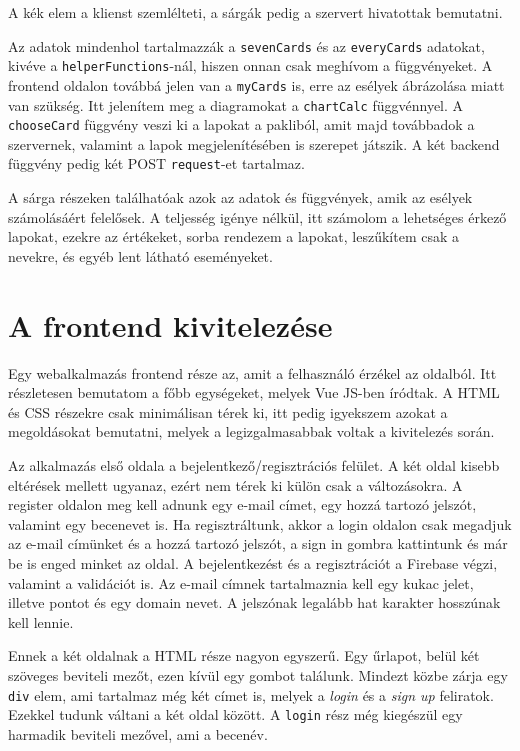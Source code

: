 \noindent A kék elem a klienst szemlélteti, a sárgák pedig a szervert hivatottak bemutatni.

Az adatok mindenhol tartalmazzák a \texttt{sevenCards} és az \texttt{everyCards} adatokat, kivéve a \texttt{helperFunctions}-nál, hiszen onnan csak meghívom a függvényeket. A frontend oldalon továbbá jelen van a \texttt{myCards} is, erre az esélyek ábrázolása miatt van szükség. Itt jelenítem meg a diagramokat a \texttt{chartCalc} függvénnyel. A \texttt{chooseCard} függvény veszi ki a lapokat a pakliból, amit majd továbbadok a szervernek, valamint a lapok megjelenítésében is szerepet játszik. A két backend függvény pedig két POST \texttt{request}-et tartalmaz.

A sárga részeken találhatóak azok az adatok és függvények, amik az esélyek számolásáért felelősek. A teljesség igénye nélkül, itt számolom a lehetséges érkező lapokat, ezekre az értékeket, sorba rendezem a lapokat, leszűkítem csak a nevekre, és egyéb lent látható eseményeket.

\section{A frontend kivitelezése}

Egy webalkalmazás frontend része az, amit a felhasználó érzékel az oldalból. Itt részletesen bemutatom a főbb egységeket, melyek Vue JS-ben íródtak. A HTML és CSS részekre csak minimálisan térek ki, itt pedig igyekszem azokat a megoldásokat bemutatni, melyek a legizgalmasabbak voltak a kivitelezés során. 


Az alkalmazás első oldala a bejelentkező/regisztrációs felület. A két oldal kisebb eltérések mellett ugyanaz, ezért nem térek ki külön csak a változásokra. A register oldalon meg kell adnunk egy e-mail címet, egy hozzá tartozó jelszót, valamint egy becenevet is. Ha regisztráltunk, akkor a login oldalon csak megadjuk az e-mail címünket és a hozzá tartozó jelszót, a sign in gombra kattintunk és már be is enged minket az oldal. A bejelentkezést és a regisztrációt a Firebase végzi, valamint a validációt is. Az e-mail címnek tartalmaznia kell egy kukac jelet, illetve pontot és egy domain nevet. A jelszónak legalább hat karakter hosszúnak kell lennie.

Ennek a két oldalnak a HTML része nagyon egyszerű. Egy űrlapot, belül két szöveges beviteli mezőt, ezen kívül egy gombot találunk. Mindezt közbe zárja egy \texttt{div} elem, ami tartalmaz még két címet is, melyek a \textit{login} és a \textit{sign up} feliratok. Ezekkel tudunk váltani a két oldal között. A \texttt{login} rész még kiegészül egy harmadik beviteli mezővel, ami a becenév.

